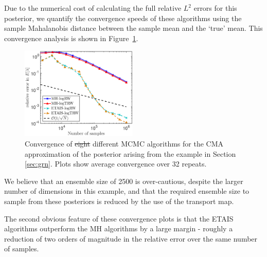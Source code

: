 \documentclass[final]{siamltex}
\newcommand{\edit}[1]{{\color{red} #1}}  %
\providecommand{\DIFadd}[1]{{\protect\color{blue}\uwave{#1}}} %
\providecommand{\DIFdel}[1]{{\protect\color{red}\sout{#1}}}                      %
\providecommand{\DIFaddFL}[1]{\DIFadd{#1}} %
\providecommand{\DIFdelFL}[1]{\DIFdel{#1}} %
\providecommand{\DIFaddbeginFL}{} %
\providecommand{\DIFaddendFL}{} %
\providecommand{\DIFdelbeginFL}{} %
\providecommand{\DIFdelendFL}{} %
\newcommand{\DIFscaledelfig}{0.5}
\newlength{\DIFdelgraphicswidth} %
\newlength{\DIFdelgraphicsheight} %
\newcommand{\DIFaddincludegraphics}[2][]{{\color{blue}\fbox{\DIFOincludegraphics[#1]{#2}}}} %
\newcommand{\DIFdelincludegraphics}[2][]{%
\sbox{\DIFdelgraphicsbox}{\DIFOincludegraphics[#1]{#2}}%
\settoboxwidth{\DIFdelgraphicswidth}{\DIFdelgraphicsbox} %
\settoboxtotalheight{\DIFdelgraphicsheight}{\DIFdelgraphicsbox} %
\scalebox{\DIFscaledelfig}{%
\parbox[b]{\DIFdelgraphicswidth}{\usebox{\DIFdelgraphicsbox}\\[-\baselineskip] \rule{\DIFdelgraphicswidth}{0em}}\llap{\resizebox{\DIFdelgraphicswidth}{\DIFdelgraphicsheight}{%
\setlength{\unitlength}{\DIFdelgraphicswidth}%
\begin{picture}(1,1)%
\thicklines\linethickness{2pt} %
{\color[rgb]{1,0,0}\put(0,0){\framebox(1,1){}}}%
{\color[rgb]{1,0,0}\put(0,0){\line( 1,1){1}}}%
{\color[rgb]{1,0,0}\put(0,1){\line(1,-1){1}}}%
\end{picture}%
}\hspace*{3pt}}} %
} %
\DeclareRobustCommand{\DIFaddbeginFL}{\DIFOaddbeginFL \let\includegraphics\DIFaddincludegraphics} %
\DeclareRobustCommand{\DIFaddendFL}{\DIFOaddendFL \let\includegraphics\DIFOincludegraphics} %
\DeclareRobustCommand{\DIFdelbeginFL}{\DIFOdelbeginFL \let\includegraphics\DIFdelincludegraphics} %
\DeclareRobustCommand{\DIFdelendFL}{\DIFOaddendFL \let\includegraphics\DIFOincludegraphics} %
\begin{document}
Due to the numerical cost of calculating the full relative $L^2$ errors for this posterior, we quantify the convergence speeds of these algorithms using the sample Mahalanobis distance between the sample mean and the `true' mean. This convergence analysis is shown in Figure~\ref{fig:grn_L2}.

\begin{figure}[!htb]
\centering
\DIFdelbeginFL %
\DIFdelendFL %
\DIFaddbeginFL \includegraphics[width=0.495\textwidth]{"images/Applications/GRN_convergence_log"}
\DIFaddendFL \caption{Convergence of \DIFdelbeginFL \DIFdelFL{eight }\DIFdelendFL \DIFaddbeginFL \DIFaddFL{four }\DIFaddendFL different MCMC algorithms for the CMA
  approximation of the  posterior arising from the example in Section
  \ref{sec:grn}. \DIFaddbeginFL \edit{Plots show average
    convergence over 32 repeats.}\DIFaddendFL }
\label{fig:grn_L2}
\end{figure}

We believe that an ensemble size of 2500
is over-cautious, despite the larger number of dimensions in this
example, and that the required ensemble size to sample
from these posteriors is reduced by the use of the transport map.

The second obvious feature of these convergence plots is that the ETAIS
algorithms outperform the MH algorithms by a large margin - roughly a
reduction of two orders of magnitude in the relative error over the
same number of samples.
\end{document}
